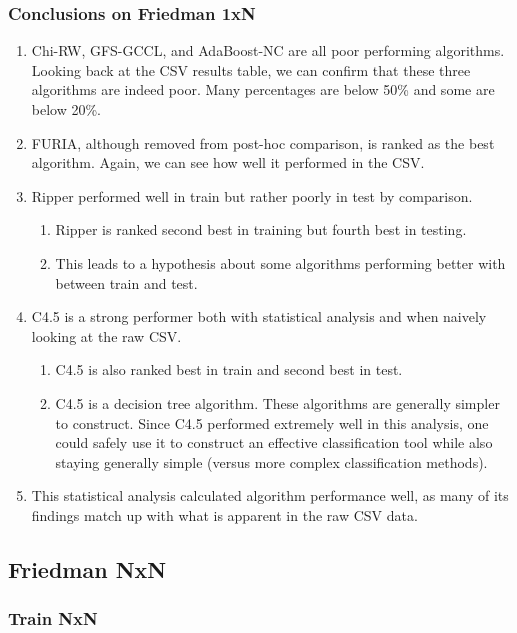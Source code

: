 \documentclass[a4paper,11pt]{article}
\begin{document}
\subsubsection{Conclusions on Friedman 1xN}
\begin{enumerate}
\item Chi-RW, GFS-GCCL, and AdaBoost-NC are all poor performing algorithms. Looking back at the CSV results table, we can confirm that these three algorithms are indeed poor. Many percentages are below 50\% and some are below 20\%.
\item FURIA, although removed from post-hoc comparison, is ranked as the best algorithm. Again, we can see how well it performed in the CSV.
\item Ripper performed well in train but rather poorly in test by comparison.
\begin{enumerate}
\item Ripper is ranked second best in training but fourth best in testing.
\item This leads to a hypothesis about some algorithms performing better with between train and test.
\end{enumerate}
\item C4.5 is a strong performer both with statistical analysis and when naively looking at the raw CSV.
\begin{enumerate}
\item C4.5 is also ranked best in train and second best in test.
\item C4.5 is a decision tree algorithm. These algorithms are generally simpler to construct. Since C4.5 performed extremely well in this analysis, one could safely use it to construct an effective classification tool while also staying generally simple (versus more complex classification methods).
\end{enumerate}
\item This statistical analysis calculated algorithm performance well, as many of its findings match up with what is apparent in the raw CSV data.
\end{enumerate}

\subsection{Friedman NxN}

\subsubsection{Train NxN}
\end{document}
